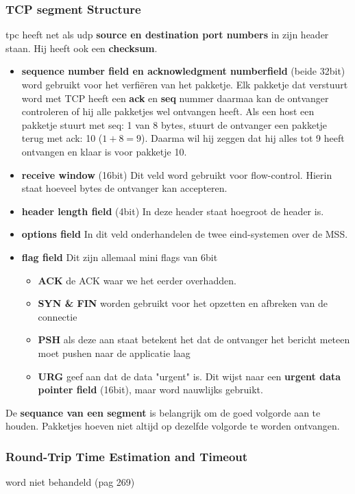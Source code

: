 \subsubsection{TCP segment Structure}
tpc heeft net als udp \textbf{source en destination port numbers} in zijn header staan. Hij heeft ook een
\textbf{checksum}.
\newline
\begin{itemize}
    \item \textbf{sequence number field en acknowledgment numberfield} (beide 32bit) word gebruikt voor het verfiëren
    van het
    pakketje. Elk pakketje dat verstuurt word met TCP heeft een \textbf{ack} en \textbf{seq} nummer daarmaa kan de
    ontvanger controleren of hij alle pakketjes wel ontvangen heeft. Als een host een pakketje stuurt met seq: 1 van
    8 bytes, stuurt de ontvanger een pakketje terug met ack: 10 ($1 + 8 = 9$). Daarma wil hij zeggen dat hij alles
    tot 9 heeft ontvangen en klaar is voor pakketje 10.
    \item \textbf{receive window} (16bit) Dit veld word gebruikt voor flow-control. Hierin staat hoeveel bytes de
    ontvanger kan accepteren.
    \item \textbf{header length field} (4bit) In deze header staat hoegroot de header is.
    \item \textbf{options field} In dit veld onderhandelen de twee eind-systemen over de MSS.
    \item \textbf{flag field} Dit zijn allemaal mini flags van 6bit
        \begin{itemize}
            \item \textbf{ACK} de ACK waar we het eerder overhadden.
            \item \textbf{SYN & FIN} worden gebruikt voor het opzetten en afbreken van de connectie
            \item \textbf{PSH} als deze aan staat betekent het dat de ontvanger het bericht meteen moet pushen naar
            de applicatie laag
            \item \textbf{URG} geef aan dat de data "urgent" is. Dit wijst naar een \textbf{urgent data pointer
            field} (16bit), maar word nauwlijks gebruikt.
        \end{itemize}
\end{itemize}
De \textbf{sequance van een segment} is belangrijk om de goed volgorde aan te houden. Pakketjes hoeven niet altijd op
dezelfde volgorde te worden ontvangen.

\subsubsection{Round-Trip Time Estimation and Timeout}
word niet behandeld (pag 269)
